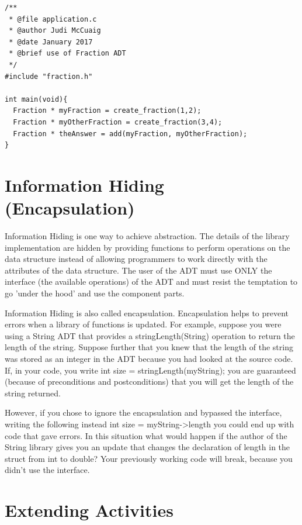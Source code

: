 \begin{lstlisting}
/**
 * @file application.c
 * @author Judi McCuaig
 * @date January 2017
 * @brief use of Fraction ADT
 */
#include "fraction.h"

int main(void){
  Fraction * myFraction = create_fraction(1,2);
  Fraction * myOtherFraction = create_fraction(3,4);
  Fraction * theAnswer = add(myFraction, myOtherFraction);
}

\end{lstlisting}


\section{Information Hiding (Encapsulation)}
Information Hiding is one way to achieve abstraction.  The details of the library implementation are hidden by providing functions to perform operations on the data structure instead of allowing programmers to work directly with the attributes of the data structure. The user of the ADT must use ONLY the interface (the available operations) of the ADT and must resist the temptation to go 'under the hood' and use the component parts.

Information Hiding is also called encapsulation.  Encapsulation helps to prevent errors when a library of functions is updated. For example, suppose you were using a String ADT that provides a stringLength(String) operation to return the length of the string. Suppose further that you knew that the length of the string was stored as an integer in the ADT because you had looked at the source code.
If, in your code, you write int size = stringLength(myString); you are guaranteed (because of preconditions and postconditions) that you will get the length of the string returned.

However, if you  chose to ignore the encapsulation and bypassed the interface, writing the following instead int size = myString->length you could end up with code that gave errors.  In this situation what would happen if the author of the String library gives you an update that changes the declaration of length in the struct from int to double? Your previously working code will break, because you didn't use the interface.


\section{Extending Activities}


